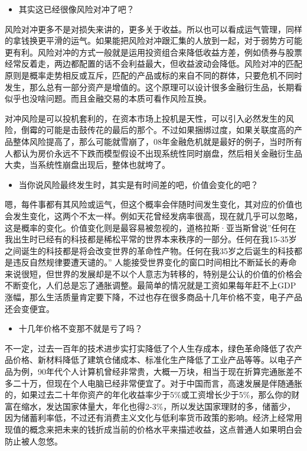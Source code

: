 \documentclass[
  letterpaper,
  DIV=11,
  numbers=noendperiod]{scrreprt}
\providecommand{\tightlist}{%
  \setlength{\itemsep}{0pt}\setlength{\parskip}{0pt}}\usepackage{longtable,booktabs,array}
\begin{document}
\begin{itemize}
\tightlist
\item
  其实这已经很像风险对冲了吧？
\end{itemize}

风险对冲更多不是对损失来讲的，更多关于收益。所以也可以看成运气管理，同样的拿钱换更平滑的运气。如果能把风险对冲跟汇集的人放到一起，对于弱势方可能更有利。风险对冲的方式一般就是运用投资组合来降低收益方差，例如债券与股票经常反着走，两边都配置的话不会利益最大，但收益波动会降低。风险对冲的匹配原则是概率走势相反或互斥，匹配的产品或标的来自不同的群体，只要危机不同时发生，那么总有一部分资产是增值的。这个原理可以设计很多金融衍生品，长期看似乎也没啥问题。而且金融交易的本质可看作风险互换。

对冲风险是可以投机套利的，在资本市场上投机是天性，可以引入必然发生的风险，倒霉的可能是击鼓传花的最后的那个。不过如果捆绑过度，如果关联度高的产品整体风险提高了，那么可能就雪崩了，08年金融危机就是最好的例子，当时所有人都认为房价永远不下跌而模型假设不出现系统性同时崩盘，然后相关金融衍生品大卖，当系统性崩盘出现后，整体也就垮了。

\begin{itemize}
\tightlist
\item
  当你说风险最终发生时，其实是有时间差的吧，价值会变化的吧？
\end{itemize}

嗯，每件事都有其风险或运气，但这个概率会伴随时间发生变化，其对应的价值也会发生变化，这两个不太一样。例如天花曾经发病率很高，现在就几乎可以忽略，这是概率的变化。价值变化则是最容易被忽视的，道格拉斯·亚当斯曾说''任何在我出生时已经有的科技都是稀松平常的世界本来秩序的一部分。任何在我15-35岁之间诞生的科技都是将会改变世界的革命性产物。任何在我35岁之后诞生的科技都是违反自然规律要遭天谴的。''
人能接受世界变化的窗口时间相比不断延长的寿命来说很短，但世界的发展却是不以个人意志为转移的，特别是公认的价值的价格会不断变化，人们总是忘了通胀调整。最简单的情况就是工资如果每年赶不上GDP涨幅，那么生活质量肯定要下降，不过也存在很多商品十几年价格不变，电子产品还会变便宜。

\begin{itemize}
\tightlist
\item
  十几年价格不变那不就是亏了吗？
\end{itemize}

不一定，过去一百年的技术进步实打实降低了个人生存成本，绿色革命降低了农产品价格、新材料降低了建筑仓储成本、标准化生产降低了工业产品等等。以电子产品为例，90年代个人计算机曾经非常贵，大概一万块，相当于现在折算完通胀差不多二十万，但现在个人电脑已经非常便宜了。对于中国而言，高速发展是伴随通胀的，如果过去二十年你资产的年化收益率少于5\%或工资增长少于5\%，那么你的财富在缩水，发达国家体量大，年化也得2-3\%，所以发达国家理财的多，储蓄少，因为储蓄利率低，不过还有消费主义文化与低利率货币政策的影响。经济上经常用现值的概念来把未来的钱折成当前的价格水平来描述收益，这点普通人如果明白会防止被人忽悠。
\end{document}
